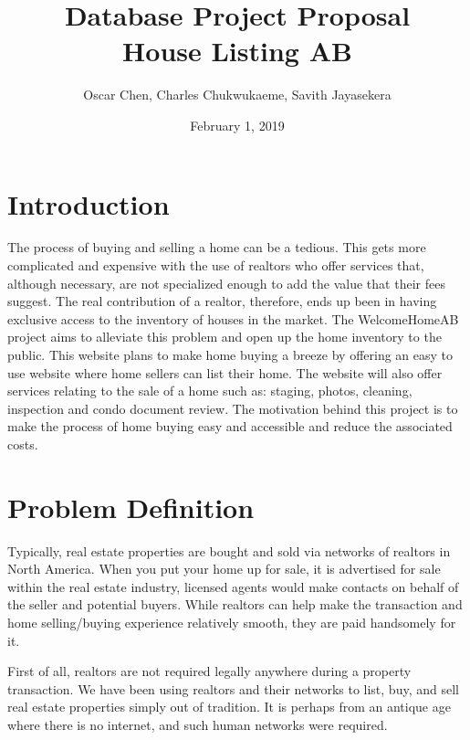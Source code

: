 \documentclass[letterpaper,12pt]{article}
\begin{document}
\title{\Large{\textbf{Database Project Proposal \\ House Listing AB}}}
\author{Oscar Chen, Charles Chukwukaeme, Savith Jayasekera}
\date{February 1, 2019}
\setlength{\droptitle}{-2.5cm}
\maketitle


\section{Introduction}

The process of buying and selling a home can be a tedious. This gets more complicated and expensive with the use of realtors who offer services that, although necessary, are not specialized enough to add the value that their fees suggest. The real contribution of a realtor, therefore, ends up been in having exclusive access to the inventory of houses in the market. 
The WelcomeHomeAB project aims to alleviate this problem and open up the home inventory to the public. This website plans to make home buying a breeze by offering an easy to use website where home sellers can list their home. The website will also offer services relating to the sale of a home such as: staging, photos, cleaning, inspection and condo document review.
The motivation behind this project is to make the process of home buying easy and accessible and reduce the associated costs.


\section{Problem Definition}

Typically, real estate properties are bought and sold via networks of realtors in North America. When you put your home up for sale, it is advertised for sale within the real estate industry, licensed agents would make contacts on behalf of the seller and potential buyers. While realtors can help make the transaction and home selling/buying experience relatively smooth, they are paid handsomely for it. 

First of all, realtors are not required legally anywhere during a property transaction. We have been using realtors and their networks to list, buy, and sell real estate properties simply out of tradition. It is perhaps from an antique age where there is no internet, and such human networks were required.
\end{document}
